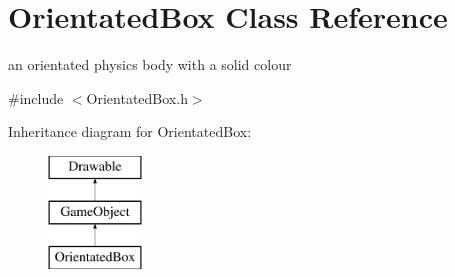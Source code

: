 \hypertarget{class_orientated_box}{\section{Orientated\+Box Class Reference}
\label{class_orientated_box}
}


an orientated physics body with a solid colour  




{\ttfamily \#include $<$Orientated\+Box.\+h$>$}

Inheritance diagram for Orientated\+Box\+:\begin{figure}[H]
\begin{center}
\leavevmode
\includegraphics[height=3.000000cm]{class_orientated_box}
\end{center}
\end{figure}
